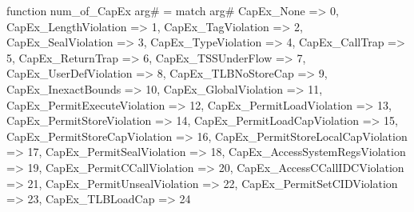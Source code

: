 function num_of_CapEx arg# = match arg# {
  CapEx_None => 0,
  CapEx_LengthViolation => 1,
  CapEx_TagViolation => 2,
  CapEx_SealViolation => 3,
  CapEx_TypeViolation => 4,
  CapEx_CallTrap => 5,
  CapEx_ReturnTrap => 6,
  CapEx_TSSUnderFlow => 7,
  CapEx_UserDefViolation => 8,
  CapEx_TLBNoStoreCap => 9,
  CapEx_InexactBounds => 10,
  CapEx_GlobalViolation => 11,
  CapEx_PermitExecuteViolation => 12,
  CapEx_PermitLoadViolation => 13,
  CapEx_PermitStoreViolation => 14,
  CapEx_PermitLoadCapViolation => 15,
  CapEx_PermitStoreCapViolation => 16,
  CapEx_PermitStoreLocalCapViolation => 17,
  CapEx_PermitSealViolation => 18,
  CapEx_AccessSystemRegsViolation => 19,
  CapEx_PermitCCallViolation => 20,
  CapEx_AccessCCallIDCViolation => 21,
  CapEx_PermitUnsealViolation => 22,
  CapEx_PermitSetCIDViolation => 23,
  CapEx_TLBLoadCap => 24
}
